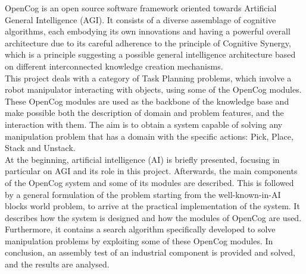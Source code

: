 
OpenCog is an open source software framework oriented towards Artificial General Intelligence (AGI).  It consists of a diverse assemblage of cognitive algorithms, each embodying its own innovations and having a powerful overall architecture due to its careful adherence to the principle of Cognitive Synergy, which is a principle suggesting a possible general intelligence architecture based on different interconnected knowledge creation mechanisms. \\
This project deals with a category of Task Planning problems, which involve a robot manipulator interacting with objects, using some of the OpenCog modules. 
These OpenCog modules are used as the backbone of the knowledge base and make possible both the description of domain and problem features, and the interaction with them.
The aim is to obtain a system capable of solving any manipulation problem that has a domain with the specific actions: Pick, Place, Stack and Unstack. \\ 
At the beginning, artificial intelligence (AI) is briefly presented, focusing in particular on AGI and its role in this project. Afterwards, the main components of the OpenCog system and some of its modules are described. This is followed by a general formulation of the problem starting from the well-known-in-AI blocks world problem, to arrive at the practical implementation of the system. It describes how the system is designed and how the modules of OpenCog are used. Furthermore, it contains a search algorithm specifically developed to solve manipulation problems by exploiting some of these OpenCog modules. In conclusion, an assembly test of an industrial component is provided and solved, and the results are analysed. \\